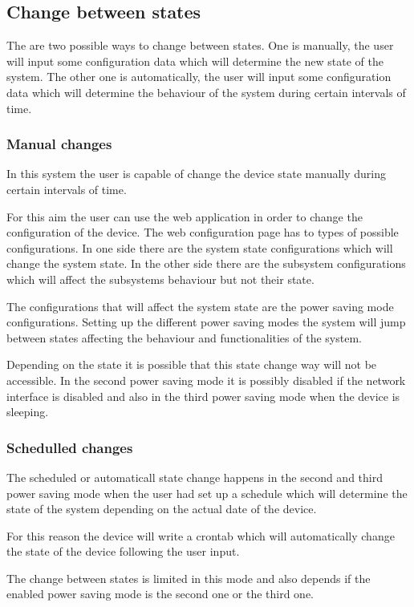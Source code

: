 		\subsection{Change between states}
		The are two possible ways to change between states. One is manually, the user will input some configuration data which will determine the new state of the system. The other one is automatically, the user will input some configuration data which will determine the behaviour of the system during certain intervals of time.

			\subsubsection{Manual changes}
			In this system the user is capable of change the device state manually during certain intervals of time.

			For this aim the user can use the web application in order to change the configuration of the device. The web configuration page has to types of possible configurations. In one side there are the system state configurations which will change the system state. In the other side there are the subsystem configurations which will affect the subsystems behaviour but not their state.

			The configurations that will affect the system state are the power saving mode configurations. Setting up the different power saving modes the system will jump between states affecting the behaviour and functionalities of the system.

			Depending on the state it is possible that this state change way will not be accessible. In the second power saving mode it is possibly disabled if the network interface is disabled and also in the third power saving mode when the device is sleeping.

			\subsubsection{Schedulled changes}
			The scheduled or automaticall state change happens in the second and third power saving mode when the user had set up a schedule which will determine the state of the system depending on the actual date of the device.

			For this reason the device will write a crontab which will automatically change the state of the device following the user input.

			The change between states is limited in this mode and also depends if the enabled power saving mode is the second one or the third one.

